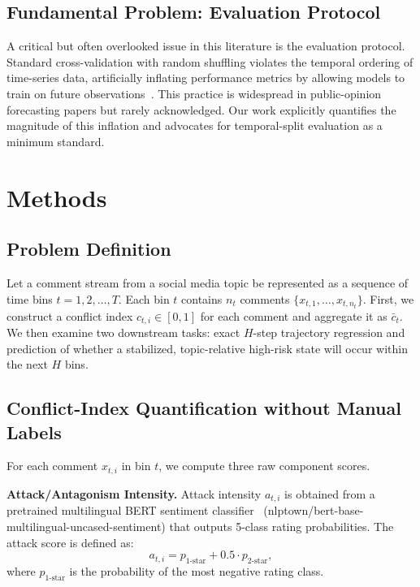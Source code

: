 \documentclass[11pt,a4paper]{article}
\begin{document}
\subsection{Fundamental Problem: Evaluation Protocol}

A critical but often overlooked issue in this literature is the evaluation protocol. Standard cross-validation with random shuffling violates the temporal ordering of time-series data, artificially inflating performance metrics by allowing models to train on future observations~\cite{Bergmeir2012}. This practice is widespread in public-opinion forecasting papers but rarely acknowledged. Our work explicitly quantifies the magnitude of this inflation and advocates for temporal-split evaluation as a minimum standard.

\section{Methods}

\subsection{Problem Definition}

Let a comment stream from a social media topic be represented as a sequence of time bins $t = 1, 2, \dots, T$. Each bin $t$ contains $n_t$ comments $\{x_{t,1}, \dots, x_{t,n_t}\}$. First, we construct a conflict index $c_{t,i} \in [0,1]$ for each comment and aggregate it as $\bar{c}_t$. We then examine two downstream tasks: exact $H$-step trajectory regression and prediction of whether a stabilized, topic-relative high-risk state will occur within the next $H$ bins.

\subsection{Conflict-Index Quantification without Manual Labels}

For each comment $x_{t,i}$ in bin $t$, we compute three raw component scores.

\textbf{Attack/Antagonism Intensity.} Attack intensity $a_{t,i}$ is obtained from a pretrained multilingual BERT sentiment classifier~\cite{bert-multilingual-sentiment} (nlptown/bert-base-multilingual-uncased-sentiment) that outputs 5-class rating probabilities. The attack score is defined as:
\begin{equation}
a_{t,i} = p_{\text{1-star}} + 0.5 \cdot p_{\text{2-star}},
\label{eq:attack_score}
\end{equation}
where $p_{\text{1-star}}$ is the probability of the most negative rating class.
\end{document}
